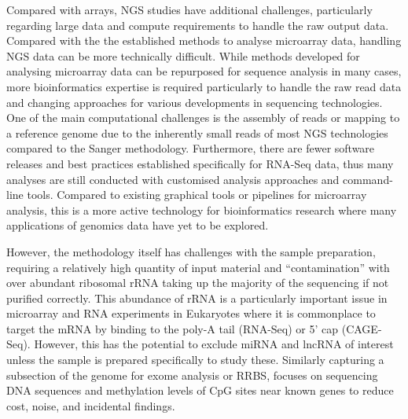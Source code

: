 Compared with arrays, \gls{NGS} studies have additional challenges, particularly regarding large data and compute requirements to handle the raw output data. Compared with the the established methods to analyse microarray data, handling \gls{NGS} data can be more technically difficult. While methods developed for analysing microarray data can be repurposed for sequence analysis in many cases, more \gls{bioinformatics} expertise is required particularly to handle the raw read data and changing approaches for various developments in sequencing technologies. One of the main computational challenges is the assembly of reads or mapping to a reference genome due to the inherently small reads of most \gls{NGS} technologies compared to the Sanger methodology. Furthermore, there are fewer software releases and best practices established specifically for \gls{RNA-Seq} data, thus many analyses are still conducted with customised analysis approaches and command-line tools. Compared to existing graphical tools or pipelines for microarray analysis, this is a more active technology for \gls{bioinformatics} research where many applications of \gls{genomics} data have yet to be explored.

However, %
the methodology itself has challenges with the sample preparation, requiring a relatively high quantity of input material and ``contamination'' with over abundant ribosomal rRNA taking up the majority of the sequencing if not purified correctly. This abundance of rRNA is a particularly important issue in microarray and \gls{RNA} experiments in Eukaryotes where it is commonplace to target the \gls{mRNA} by binding to the poly-A tail (\gls{RNA-Seq}) or 5' cap (\gls{CAGE-Seq}). However, this has the potential to exclude \gls{miRNA} and \gls{lncRNA} of interest unless the sample is prepared specifically to study these. Similarly capturing a subsection of the genome for \gls{exome} analysis or \gls{RRBS}, focuses on sequencing DNA sequences and methylation levels of CpG sites near known genes to reduce cost, noise, and incidental findings.

